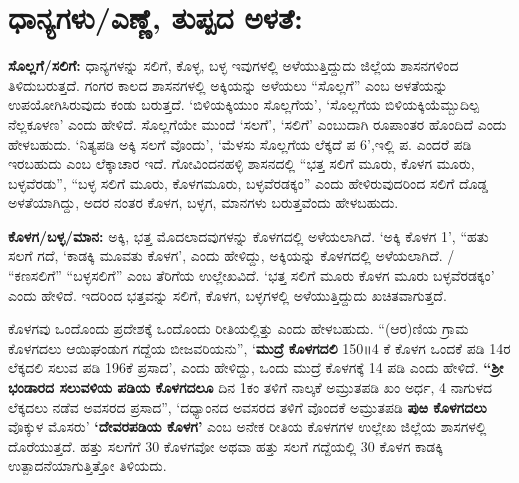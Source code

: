 \section*{ಧಾನ್ಯಗಳು/ಎಣ್ಣೆ, ತುಪ್ಪದ ಅಳತೆ:}

\textbf{ಸೊಲ್ಲಗೆ/ಸಲಿಗೆ:} ಧಾನ್ಯಗಳನ್ನು ಸಲಿಗೆ, ಕೊಳ್ಳ, ಬಳ್ಳ ಇವುಗಳಲ್ಲಿ ಅಳೆಯುತ್ತಿದ್ದುದು ಜಿಲ್ಲೆಯ ಶಾಸನಗಳಿಂದ ತಿಳಿದುಬರುತ್ತದೆ. ಗಂಗರ ಕಾಲದ ಶಾಸನಗಳಲ್ಲಿ ಅಕ್ಕಿಯನ್ನು ಅಳೆಯಲು “ಸೊಲ್ಲಗೆ” ಎಂಬ ಅಳತೆಯನ್ನು ಉಪಯೋಗಿಸಿರುವುದು ಕಂಡು ಬರುತ್ತದೆ. ‘ಬಿಳಿಯಕ್ಕಿಯುಂ ಸೊಲ್ಲಗೆಯ’, ‘ಸೊಲ್ಲಗೆಯ ಬಿಳಿಯಕ್ಕಿಯೆಮ್ಬುದಿಲ್ಪ ನೆಲ್ಲಕೂಳಣ’ ಎಂದು ಹೇಳಿದೆ. ಸೊಲ್ಲಗೆಯೇ ಮುಂದೆ ‘ಸಲಗೆ’, ‘ಸಲಿಗೆ’ ಎಂಬುದಾಗಿ ರೂಪಾಂತರ ಹೊಂದಿದೆ ಎಂದು ಹೇಳಬಹುದು. ‘ನಿತ್ಯಪಡಿ ಅಕ್ಕಿ ಸಲಗೆ ವೊಂದು’, ‘ಮೆಳಸು ಸೊಲ್ಲಗೆಯ ಲೆಕ್ಕದೆ ಪ 6’,ಇಲ್ಲಿ ಪ. ಎಂದರೆ ಪಡಿ ಇರಬಹುದು ಎಂಬ ಲೆಕ್ಕಾಚಾರ ಇದೆ. ಗೋವಿಂದನಹಳ್ಳಿ ಶಾಸನದಲ್ಲಿ “ಭತ್ತ ಸಲಿಗೆ ಮೂರು, ಕೊಳಗ ಮೂರು, ಬಳ್ಳವೆರಡು”, “ಬಳ್ಳ ಸಲಿಗೆ ಮೂರು, ಕೊಳಗಮೂರು, ಬಳ್ಳವೆರಡಕ್ಕಂ” ಎಂದು ಹೇಳಿರುವುದರಿಂದ ಸಲಿಗೆ ದೊಡ್ಡ ಅಳತೆಯಾಗಿದ್ದು, ಅದರ ನಂತರ ಕೊಳಗ, ಬಳ್ಳಗ, ಮಾನಗಳು ಬರುತ್ತವೆಂದು ಹೇಳಬಹುದು.

\textbf{ಕೊಳಗ/ಬಳ್ಳ/ಮಾನ:} ಅಕ್ಕಿ, ಭತ್ತ ಮೊದಲಾದವುಗಳನ್ನು ಕೊಳಗದಲ್ಲಿ ಅಳೆಯಲಾಗಿದೆ. ‘ಅಕ್ಕಿ ಕೊಳಗ 1’, “ಹತು ಸಲಗೆ ಗದೆ, ‘ಕಾಡಕ್ಕಿ ಮೂವತು ಕೊಳಗ’, ಎಂದು ಹೇಳಿದ್ದು, ಅಕ್ಕಿಯನ್ನು ಕೊಳಗದಲ್ಲಿ ಅಳೆಯಲಾಗಿದೆ. / “ಕಣಸಲಿಗೆ” “ಬಳ್ಳಸಲಿಗೆ” ಎಂಬ ತೆರಿಗೆಯ ಉಲ್ಲೇಖವಿದೆ. ‘ಭತ್ತ ಸಲಿಗೆ ಮೂರು ಕೊಳಗ ಮೂರು ಬಳ್ಳವೆರಡಕ್ಕಂ’ ಎಂದು ಹೇಳಿದೆ. ಇದರಿಂದ ಭತ್ತವನ್ನು ಸಲಿಗೆ, ಕೊಳಗ, ಬಳ್ಳಗಳಲ್ಲಿ ಅಳೆಯುತ್ತಿದ್ದುದು ಖಚಿತವಾಗುತ್ತದೆ.

ಕೊಳಗವು ಒಂದೊಂದು ಪ್ರದೇಶಕ್ಕೆ ಒಂದೊಂದು ರೀತಿಯಲ್ಲಿತ್ತು ಎಂದು ಹೇಳಬಹುದು. “(ಆರ)ಣಿಯ ಗ್ರಾಮ ಕೊಳಗದಲು ಆಯಿಘಂಡುಗ ಗದ್ದೆಯ ಬೀಜವರಿಯನು”, ‘\textbf{ಮುದ್ರೆ ಕೊಳಗದಲಿ} 150॥4 ಕೆ ಕೊಳಗ ಒಂದಕೆ ಪಡಿ 14ರ ಲೆಕ್ಕದಲಿ ಸಲುವ ಪಡಿ 196ಕೆ ಪ್ರಸಾದ’, ಎಂದು ಹೇಳಿದ್ದು, ಒಂದು ಮುದ್ರೆ ಕೊಳಗಕ್ಕೆ 14 ಪಡಿ ಎಂದು ಹೇಳಿದೆ. \textbf{“ಶ‍್ರೀ} \textbf{ಭಂಡಾರದ ಸಲುವಳಿಯ ಪಡಿಯ ಕೊಳಗದಲೂ} ದಿನ 1ಕಂ ತಳಿಗೆ ನಾಲ್ಕಕೆ ಅಮ್ರುತಪಡಿ ಖಂ ಅರ್ಧ, 4 ನಾಗುಳದ ಲೆಕ್ಕದಲು ನಡೆವ ಅವಸರದ ಪ್ರಸಾದ”, ‘ದಧ್ಯಾಂನದ ಅವಸರದ ತಳಿಗೆ ವೊಂದಕೆ ಅಮ್ರುತಪಡಿ \textbf{ಪುಱ ಕೊಳಗದಲು} ವೊಕ್ಕುಳ ಮೊಸರು’ \textbf{‘ದೇವರಪಡಿಯ ಕೊಳಗ’} ಎಂಬ ಅನೇಕ ರೀತಿಯ ಕೊಳಗಗಳ ಉಲ್ಲೇಖ ಜಿಲ್ಲೆಯ ಶಾಸಗಳಲ್ಲಿ ದೊರೆಯುತ್ತದೆ. ಹತ್ತು ಸಲಗೆಗೆ 30 ಕೊಳಗವೋ ಅಥವಾ ಹತ್ತು ಸಲಗೆ ಗದ್ದೆಯಲ್ಲಿ 30 ಕೊಳಗ ಕಾಡಕ್ಕಿ ಉತ್ಪಾದನೆಯಾಗುತ್ತಿತ್ತೋ ತಿಳಿಯದು.


